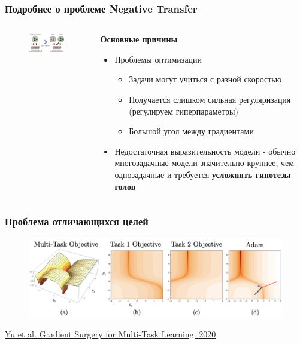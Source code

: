 \documentclass[aspectratio=169]{beamer}
\begin{document}
\begin{frame}
	\frametitle{Подробнее о проблеме Negative Transfer}
	\begin{columns}
		\begin{column}{0.5\textwidth}
			\begin{figure}
	       		\includegraphics[width=1\textwidth]{assets/nt.png}
	    	\end{figure}
		\end{column}
		\begin{column}{0.5\textwidth}
			\textbf{Основные причины}
			\begin{itemize}
				\item Проблемы оптимизации
				\begin{itemize}
					\item Задачи могут учиться с разной скоростью
					\item Получается слишком сильная регуляризация (регулируем гиперпараметры)
					\item Большой угол между градиентами
				\end{itemize}
				\item Недостаточная выразительность модели - обычно многозадачные модели значительно крупнее, чем однозадачные и требуется \textbf{усложнять гипотезы голов}
			\end{itemize}
		\end{column}
	\end{columns}
\end{frame}

\begin{frame}
	\frametitle{Проблема отличающихся целей}
	\begin{figure}
	    \includegraphics[width=1\textwidth]{assets/grad_angle.png}
	\end{figure}
	\href{https://arxiv.org/abs/2001.06782}{\color {blue} Yu et al. Gradient Surgery for Multi-Task Learning. 2020}
\end{frame}
\end{document}
